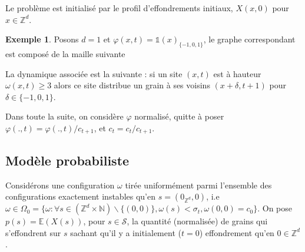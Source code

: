 \documentclass{article}
\theoremstyle{definition}
\newtheorem{exmp}{Exemple}[section]
\begin{document}
Le problème est initialisé par le profil d'effondrements initiaux, $X(x, 0)$ pour $x\in\mathbb{Z}^d$. 

\begin{exmp}
Posons $d=1$ et $\varphi(x,t) =\mathds{1}(x)_{\{-1,0,1\}}$, le graphe correspondant est composé de la maille suivante \begin{center}  
\end{center}
La dynamique associée est la suivante : si un site $(x,t)$ est à hauteur $\omega(x,t)\geq  3$ alors ce site distribue un grain à ses voisins $(x+\delta,t+1)$ pour $\delta\in \{-1,0,1\}$.
\end{exmp}

Dans toute la suite, on considère $\varphi$ normalisé, quitte à poser $\varphi(., t) = \varphi(., t)/c_{t+1}$, et $c_t = c_t/c_{t+1}$. 
\subsection{Modèle probabiliste}
Considérons une configuration $\omega$ tirée uniformément parmi l'ensemble des configurations exactement instables qu'en $s=(0_{\mathbb{Z}^d},0)$, i.e $ \omega \in \Omega_{0} = \{\omega : \forall s\in (\mathbb{Z}^d\times\mathbb{N})\backslash\{(0,0)\}, \omega(s)<\sigma_t, \omega(0, 0) = c_0\}$. On pose $p(s) = \mathbb{E}(X(s))$, pour $s\in\mathcal{S}$, la quantité (normalisée) de grains qui s'effondrent sur $s$ sachant qu'il y a initialement ($t=0$) effondrement qu'en $0\in\mathbb{Z}^d$. 
\end{document}
